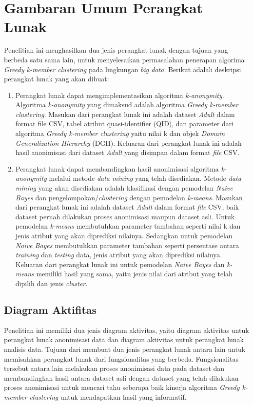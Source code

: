 \section{Gambaran Umum Perangkat Lunak}
Penelitian ini menghasilkan dua jenis perangkat lunak dengan tujuan yang berbeda satu sama lain, untuk menyelesaikan permasalahan penerapan algorima \textit{Greedy k-member clustering} pada lingkungan \textit{big data}. Berikut adalah deskripsi perangkat lunak yang akan dibuat:

\begin{enumerate}

\item Perangkat lunak dapat mengimplementasikan algoritma \textit{k-anonymity}. Algoritma \textit{k-anonymity} yang dimaksud adalah algoritma \textit{Greedy k-member clustering}. Masukan dari perangkat lunak ini adalah dataset \textit{Adult} dalam format file CSV, tabel atribut quasi-identifier (QID), dan parameter dari algoritma \textit{Greedy k-member clustering} yaitu nilai k dan objek \textit{Domain Generalization Hierarchy} (DGH). Keluaran dari perangkat lunak ini adalah hasil anonimisasi dari dataset \textit{Adult} yang disimpan dalam format \textit{file} CSV.

\item Perangkat lunak dapat membandingkan hasil anonimisasi algoritma \textit{k-anonymity} melalui metode \textit{data mining} yang telah disediakan. Metode \textit{data mining} yang akan disediakan adalah klasifikasi dengan pemodelan \textit{Naive Bayes} dan pengelompokan/\textit{clustering} dengan pemodelan \textit{k-means}. Masukan dari perangkat lunak ini adalah dataset \textit{Adult} dalam format \textit{file} CSV, baik dataset pernah dilakukan proses anonimisasi maupun dataset asli. Untuk pemodelan \textit{k-means} membutuhkan parameter tambahan seperti nilai k dan jenis atribut yang akan diprediksi nilainya. Sedangkan untuk pemodelan \textit{Naive Bayes} membutuhkan parameter tambahan seperti persentase antara \textit{training} dan \textit{testing} data, jenis atribut yang akan diprediksi nilainya. Keluaran dari perangkat lunak ini untuk pemodelan \textit{Naive Bayes} dan \textit{k-means} memiliki hasil yang sama, yaitu jenis nilai dari atribut yang telah dipilih dan jenis \textit{cluster}.

\end{enumerate}

\subsection{Diagram Aktifitas}
Penelitian ini memiliki dua jenis diagram aktivitas,  yaitu diagram aktivitas untuk perangkat lunak anonimisasi data dan diagram aktivitas untuk perangkat lunak analisis data. Tujuan dari membuat dua jenis perangkat lunak antara lain untuk memisahkan perangkat lunak dari fungsionalitas yang berbeda. Fungsionalitas tersebut antara lain melakukan proses anonimisasi data pada dataset dan membandingkan hasil antara dataset asli dengan dataset yang telah dilakukan proses anonimisasi untuk mencari tahu seberapa baik kinerja algoritma \textit{Greedy k-member clustering} untuk mendapatkan hasil yang informatif.

